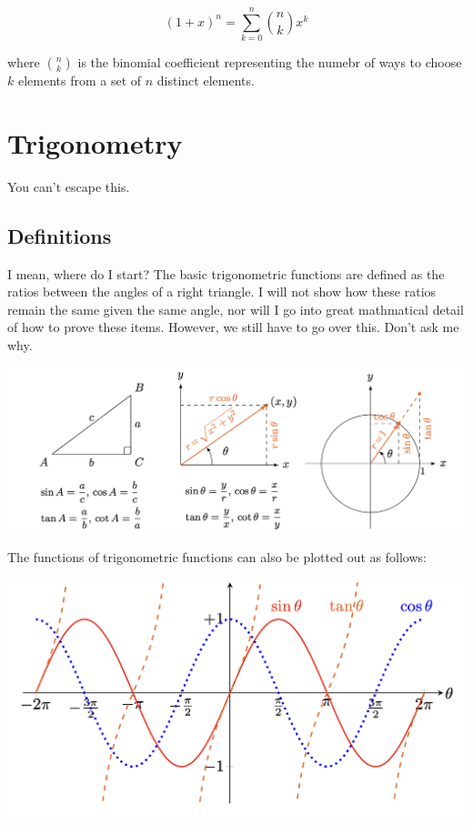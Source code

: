 \documentclass[12pt]{article}
\theoremstyle{definition}
\begin{document}
$$(1 + x)^n = \sum_{k=0}^{n} \binom{n}{k} x^k$$

where $\binom{n}{k}$ is the binomial coefficient representing the numebr of ways to choose $k$ elements from a set of $n$ distinct elements.

\break

\section{Trigonometry}

You can't escape this.

\subsection{Definitions}

I mean, where do I start? The basic trigonometric functions are defined as the ratios between the angles of a right triangle. I will not show how these ratios remain the same given the same angle, nor will I go into great mathmatical detail of how to prove these items. However, we still have to go over this. Don't ask me why. 

\includegraphics[width=\textwidth]{2_trig0}

The functions of trigonometric functions can also be plotted out as follows:

\includegraphics[width=\textwidth]{2_trig1}
\end{document}
